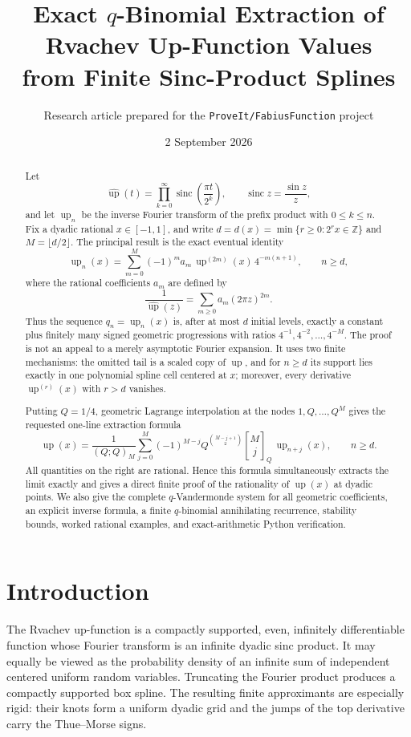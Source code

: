 \documentclass[11pt]{article}
\title{\bfseries Exact \(q\)-Binomial Extraction of Rvachev Up-Function Values\\
from Finite Sinc-Product Splines}
\author{Research article prepared for the \texttt{ProveIt/FabiusFunction} project}
\date{2 September 2026}
\newcommand{\Z}{\mathbb{Z}}
\newcommand{\upf}{\operatorname{up}}
\newcommand{\sinc}{\operatorname{sinc}}
\newcommand{\qbinom}[3]{\genfrac{[}{]}{0pt}{}{#1}{#2}_{#3}}
\begin{document}
\maketitle

\begin{abstract}
Let
\[
 \widehat{\upf}(t)=\prod_{k=0}^{\infty}\sinc\!\left(\frac{\pi t}{2^k}\right),
 \qquad \sinc z=\frac{\sin z}{z},
\]
and let \(\upf_n\) be the inverse Fourier transform of the prefix product with
\(0\le k\le n\).  Fix a dyadic rational \(x\in[-1,1]\), and write
\(d=d(x)=\min\{r\ge0:2^r x\in\Z\}\) and \(M=\lfloor d/2\rfloor\).
The principal result is the exact eventual identity
\[
 \upf_n(x)=\sum_{m=0}^{M}(-1)^m a_m\,
 \upf^{(2m)}(x)\,4^{-m(n+1)},\qquad n\ge d,
\]
where the rational coefficients \(a_m\) are defined by
\[
 \frac{1}{\widehat{\upf}(z)}
 =\sum_{m\ge0}a_m(2\pi z)^{2m}.
\]
Thus the sequence \(q_n=\upf_n(x)\) is, after at most \(d\) initial levels,
exactly a constant plus finitely many signed geometric progressions with ratios
\(4^{-1},4^{-2},\ldots,4^{-M}\).  The proof is not an appeal to a merely
asymptotic Fourier expansion.  It uses two finite mechanisms: the omitted tail
is a scaled copy of \(\upf\), and for \(n\ge d\) its support lies exactly in one
polynomial spline cell centered at \(x\); moreover, every derivative
\(\upf^{(r)}(x)\) with \(r>d\) vanishes.

Putting \(Q=1/4\), geometric Lagrange interpolation at the nodes
\(1,Q,\ldots,Q^M\) gives the requested one-line extraction formula
\[
 \boxed{\displaystyle
 \upf(x)=\frac{1}{(Q;Q)_M}
 \sum_{j=0}^{M}(-1)^{M-j}Q^{\binom{M-j+1}{2}}
 \qbinom{M}{j}{Q}\,\upf_{n+j}(x),\qquad n\ge d.}
\]
All quantities on the right are rational.  Hence this formula simultaneously
extracts the limit exactly and gives a direct finite proof of the rationality of
\(\upf(x)\) at dyadic points.  We also give the complete \(q\)-Vandermonde
system for all geometric coefficients, an explicit inverse formula, a finite
\(q\)-binomial annihilating recurrence, stability bounds, worked rational
examples, and exact-arithmetic Python verification.
\end{abstract}

\tableofcontents
\clearpage

\section{Introduction}

The Rvachev up-function is a compactly supported, even, infinitely
differentiable function whose Fourier transform is an infinite dyadic sinc
product.  It may equally be viewed as the probability density of an infinite
sum of independent centered uniform random variables.  Truncating the Fourier
product produces a compactly supported box spline.  The resulting finite
approximants are especially rigid: their knots form a uniform dyadic grid and
the jumps of the top derivative carry the Thue--Morse signs.
\end{document}
